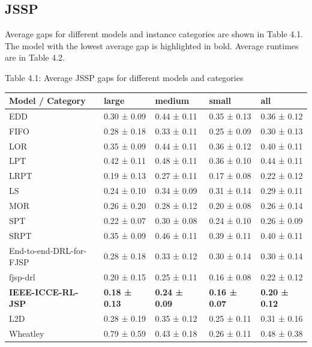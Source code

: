 \subsection{JSSP}
Average gaps for different models and instance categories are shown in Table 4.1. The model with the lowest average gap is highlighted in bold. Average runtimes are in Table 4.2. 

\begin{table}[H]
    Table 4.1: Average JSSP gaps for different models and categories\\
    \vspace{1mm}
    \small 
    \begin{tabular}{lllll}
        \toprule
        Model / Category & large & medium & small & all \\ 
        \midrule
        EDD & 0.30 ± 0.09 & 0.44 ± 0.11 & 0.35 ± 0.13 & 0.36 ± 0.12 \\
        FIFO & 0.28 ± 0.18 & 0.33 ± 0.11 & 0.25 ± 0.09 & 0.30 ± 0.13  \\
        LOR & 0.35 ± 0.09 & 0.44 ± 0.11 & 0.36 ± 0.12 & 0.40 ± 0.11\\
        LPT & 0.42 ± 0.11 & 0.48 ± 0.11 & 0.36 ± 0.10 & 0.44 ± 0.11\\
        LRPT & 0.19 ± 0.13 & 0.27 ± 0.11 & 0.17 ± 0.08 & 0.22 ± 0.12 \\
        LS & 0.24 ± 0.10 & 0.34 ± 0.09 & 0.31 ± 0.14 & 0.29 ± 0.11 \\
        MOR & 0.26 ± 0.20 & 0.28 ± 0.12 & 0.20 ± 0.08 & 0.26 ± 0.14 \\
        SPT & 0.22 ± 0.07 & 0.30 ± 0.08 & 0.24 ± 0.10 & 0.26 ± 0.09 \\
        SRPT & 0.35 ± 0.09 & 0.46 ± 0.11 & 0.39 ± 0.11 & 0.40 ± 0.11 \\
        End-to-end-DRL-for-FJSP & 0.28 ± 0.18 & 0.33 ± 0.12 & 0.30 ± 0.14 & 0.30 ± 0.14  \\
        fjsp-drl & 0.20 ± 0.15 & 0.25 ± 0.11 & 0.16 ± 0.08 & 0.22 ± 0.12 \\
        \textbf{IEEE-ICCE-RL-JSP} & \textbf{0.18 ± 0.13} & \textbf{0.24 ± 0.09} & \textbf{0.16 ± 0.07} & \textbf{0.20 ± 0.12} \\
        L2D & 0.28 ± 0.19 & 0.35 ± 0.12 & 0.25 ± 0.11 & 0.31 ± 0.16 \\
        Wheatley & 0.79 ± 0.59 & 0.43 ± 0.18 & 0.26 ± 0.11 & 0.48 ± 0.38 \\
        \bottomrule
    \end{tabular}
\end{table}


